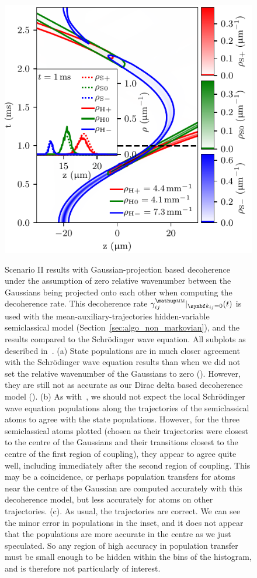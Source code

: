 {\begin{figure}
{    \includegraphics{figures/hidden_variables/hvsc_aux_mirror_bad_gamma/trajectories.pdf}
    }
    \caption{Scenario II results with Gaussian-projection based decoherence under the assumption of zero relative wavenumber between the Gaussians being projected onto each other when computing the decoherence rate. This decoherence rate $\gamma^\up{\textsc{mm}}_{ij}|_{\vec k_{ij} = 0}(t)$ is used with the mean-auxiliary-trajectories hidden-variable semiclassical model (Section~\ref{sec:algo_non_markovian}), and the results compared to the Schr\"odinger wave equation. All subplots as described in~. (a) State populations are in much closer agreement with the Schr\"odinger wave equation results than when we did not set the relative wavenumber of the Gaussians to zero (). However, they are still not as accurate as our Dirac delta based decoherence model (). (b) As with~, we should not expect the local Schr\"odinger wave equation populations along the trajectories of the semiclassical atoms to agree with the state populations. However, for the three semiclassical atoms plotted (chosen as their trajectories were closest to the centre of the Gaussians and their transitions closest to the centre of the first region of coupling), they appear to agree quite well, including immediately after the second region of coupling. This may be a coincidence, or perhaps population transfers for atoms near the centre of the Gaussian are computed accurately with this decoherence model, but less accurately for atoms on other trajectories. (c). As usual, the trajectories are correct. We can see the minor error in populations in the inset, and it does not appear that the populations are more accurate in the centre as we just speculated. So any region of high accuracy in population transfer must be small enough to be hidden within the bins of the histogram, and is therefore not particularly of interest.}\label{fig:bad_gamma}
\end{figure}
\restoregeometry}

